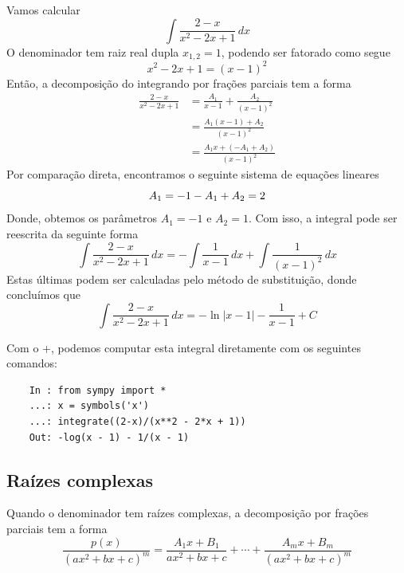\begin{ex}
  Vamos calcular
  \begin{equation}
    \int \frac{2-x}{x^2 - 2x + 1}\,dx
  \end{equation}
  O denominador tem raiz real dupla $x_{1,2} = 1$, podendo ser fatorado como segue
  \begin{equation}
    x^2 - 2x + 1 = (x-1)^2
  \end{equation}
  Então, a decomposição do integrando por frações parciais tem a forma
  \begin{align}
    \frac{2-x}{x^2 - 2x + 1} &= \frac{A_1}{x-1} + \frac{A_2}{(x-1)^2}\\
                             &= \frac{A_1(x-1) + A_2}{(x-1)^2}\\
                             &= \frac{A_1x + (-A_1 + A_2)}{(x-1)^2}
  \end{align}
  Por comparação direta, encontramos o seguinte sistema de equações lineares
  \begin{equation}
    A_1 = -1\\
    -A_1 + A_2 = 2
  \end{equation}
  Donde, obtemos os parâmetros $A_1 = -1$ e $A_2 = 1$. Com isso, a integral pode ser reescrita da seguinte forma
  \begin{equation}
    \int\frac{2-x}{x^2 - 2x + 1}\,dx = -\int\frac{1}{x-1}\,dx + \int\frac{1}{(x-1)^2}\,dx
  \end{equation}
  Estas últimas podem ser calculadas pelo método de substituição, donde concluímos que
  \begin{equation}
    \int\frac{2-x}{x^2 - 2x + 1}\,dx = -\ln|x-1| - \frac{1}{x-1} + C
  \end{equation}

  \ifispython
  Com o {\python}+{\sympy}, podemos computar esta integral diretamente com os seguintes comandos:
  \begin{lstlisting}
    In : from sympy import *
    ...: x = symbols('x')
    ...: integrate((2-x)/(x**2 - 2*x + 1))
    Out: -log(x - 1) - 1/(x - 1)
  \end{lstlisting}
  \fi  
\end{ex}

\subsection{Raízes complexas}

Quando o denominador tem raízes complexas, a decomposição por frações parciais tem a forma
\begin{equation}
  \frac{p(x)}{(ax^2 + bx + c)^m} = \frac{A_1x + B_1}{ax^2 + bx + c} + \cdots + \frac{A_mx + B_m}{(ax^2 + bx + c)^m}
\end{equation}

